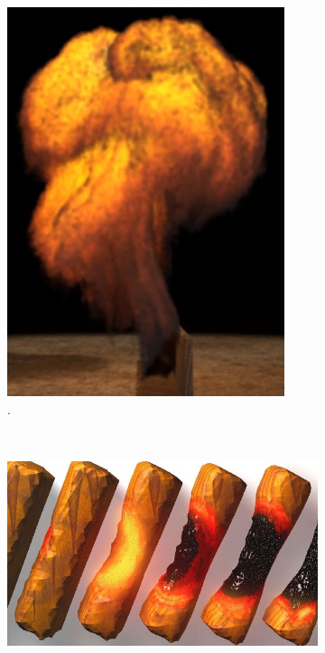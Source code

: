 \begin{figure}[htb!]
        \centering
        \begin{subfigure}[t]{0.175\textwidth}
                \includegraphics[width=\textwidth]{img/feldman_2003}
                \caption{\cite{Feldman:2003}.}
        \end{subfigure}%
        ~ %
        \begin{subfigure}[t]{0.4\textwidth}
                \includegraphics[width=\textwidth]{img/melek_2005}

\end{subfigure}
\end{figure}
